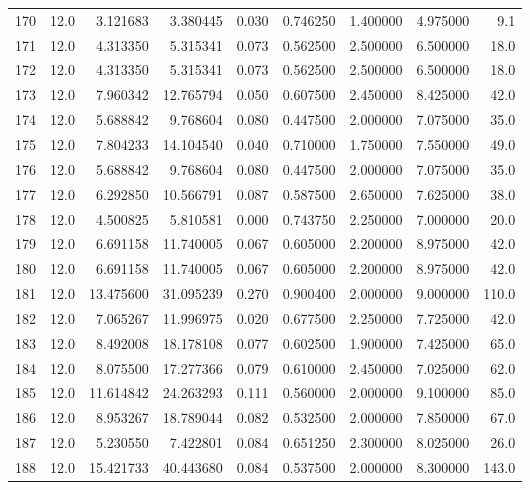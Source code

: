 \begin{tabular}{lrrrrrrrr}
170  &   12.0 &   3.121683 &   3.380445 &  0.030 &  0.746250 &  1.400000 &   4.975000 &    9.1 \\
171  &   12.0 &   4.313350 &   5.315341 &  0.073 &  0.562500 &  2.500000 &   6.500000 &   18.0 \\
172  &   12.0 &   4.313350 &   5.315341 &  0.073 &  0.562500 &  2.500000 &   6.500000 &   18.0 \\
173  &   12.0 &   7.960342 &  12.765794 &  0.050 &  0.607500 &  2.450000 &   8.425000 &   42.0 \\
174  &   12.0 &   5.688842 &   9.768604 &  0.080 &  0.447500 &  2.000000 &   7.075000 &   35.0 \\
175  &   12.0 &   7.804233 &  14.104540 &  0.040 &  0.710000 &  1.750000 &   7.550000 &   49.0 \\
176  &   12.0 &   5.688842 &   9.768604 &  0.080 &  0.447500 &  2.000000 &   7.075000 &   35.0 \\
177  &   12.0 &   6.292850 &  10.566791 &  0.087 &  0.587500 &  2.650000 &   7.625000 &   38.0 \\
178  &   12.0 &   4.500825 &   5.810581 &  0.000 &  0.743750 &  2.250000 &   7.000000 &   20.0 \\
179  &   12.0 &   6.691158 &  11.740005 &  0.067 &  0.605000 &  2.200000 &   8.975000 &   42.0 \\
180  &   12.0 &   6.691158 &  11.740005 &  0.067 &  0.605000 &  2.200000 &   8.975000 &   42.0 \\
181  &   12.0 &  13.475600 &  31.095239 &  0.270 &  0.900400 &  2.000000 &   9.000000 &  110.0 \\
182  &   12.0 &   7.065267 &  11.996975 &  0.020 &  0.677500 &  2.250000 &   7.725000 &   42.0 \\
183  &   12.0 &   8.492008 &  18.178108 &  0.077 &  0.602500 &  1.900000 &   7.425000 &   65.0 \\
184  &   12.0 &   8.075500 &  17.277366 &  0.079 &  0.610000 &  2.450000 &   7.025000 &   62.0 \\
185  &   12.0 &  11.614842 &  24.263293 &  0.111 &  0.560000 &  2.000000 &   9.100000 &   85.0 \\
186  &   12.0 &   8.953267 &  18.789044 &  0.082 &  0.532500 &  2.000000 &   7.850000 &   67.0 \\
187  &   12.0 &   5.230550 &   7.422801 &  0.084 &  0.651250 &  2.300000 &   8.025000 &   26.0 \\
188  &   12.0 &  15.421733 &  40.443680 &  0.084 &  0.537500 &  2.000000 &   8.300000 &  143.0 \\

\end{tabular}
